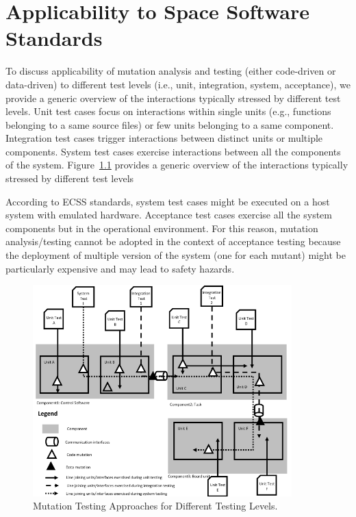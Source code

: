 
\chapter{Applicability to Space Software Standards}

To discuss applicability of mutation analysis and testing (either code-driven or data-driven) to different test levels (i.e., unit, integration, system, acceptance), we provide a generic overview of the interactions typically stressed by different test levels. Unit test cases focus on interactions within single units (e.g., functions belonging to a same source files) or few units belonging to a same component. Integration test cases trigger interactions between distinct units or multiple components. System test cases exercise interactions between all the components of the system.
Figure~\ref{fig:mutationTestingVSTestingLevels} provides a generic overview of the interactions typically stressed by different test levels

According to ECSS standards, system test cases might be executed on a host system with emulated hardware. Acceptance test cases exercise all the system components but in the operational environment. For this reason, mutation analysis/testing cannot be adopted in the context of acceptance testing because the deployment of multiple version of the system (one for each mutant) might be particularly expensive and may lead to safety hazards.
 
 
\begin{figure}[h]
  \centering
    \includegraphics[width=10cm]{images/TestingLevels}
      \caption{Mutation Testing Approaches for Different Testing Levels.}
      \label{fig:mutationTestingVSTestingLevels}
\end{figure} 

